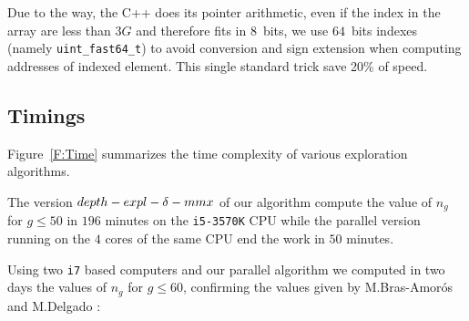 \documentclass[reqno,11pt]{amsart}
\theoremstyle{plain}
\theoremstyle{definition}
\renewcommand{\leq}{\leqslant}
\renewcommand{\tt}[1]{\texttt{#1}}
\begin{document}
Due to the way, the C++ does its pointer arithmetic, even if the index in the
array are less than $3G$ and therefore fits in $8$~bits, we use $64$~bits
indexes (namely \verb|uint_fast64_t|) to avoid conversion and sign extension
when computing addresses of indexed element. This single standard trick save
20\% of speed.

\subsection{Timings}

Figure~\ref{F:Time} summarizes the time complexity of various exploration algorithms.

The version $\small depth-expl-\delta-mmx$ of our algorithm compute the value of $n_g$ for $g\leq 50$ in $196$ minutes on the \tt{i5-3570K} CPU while the parallel version running on the $4$ cores of the same CPU end the work in $50$ minutes.

Using two \tt{i7} based computers and our  parallel algorithm  we computed in two days the values of $n_g$ for $g\leq 60$, confirming the values given by M.Bras-Amor\'os and M.Delgado : 
\end{document}
